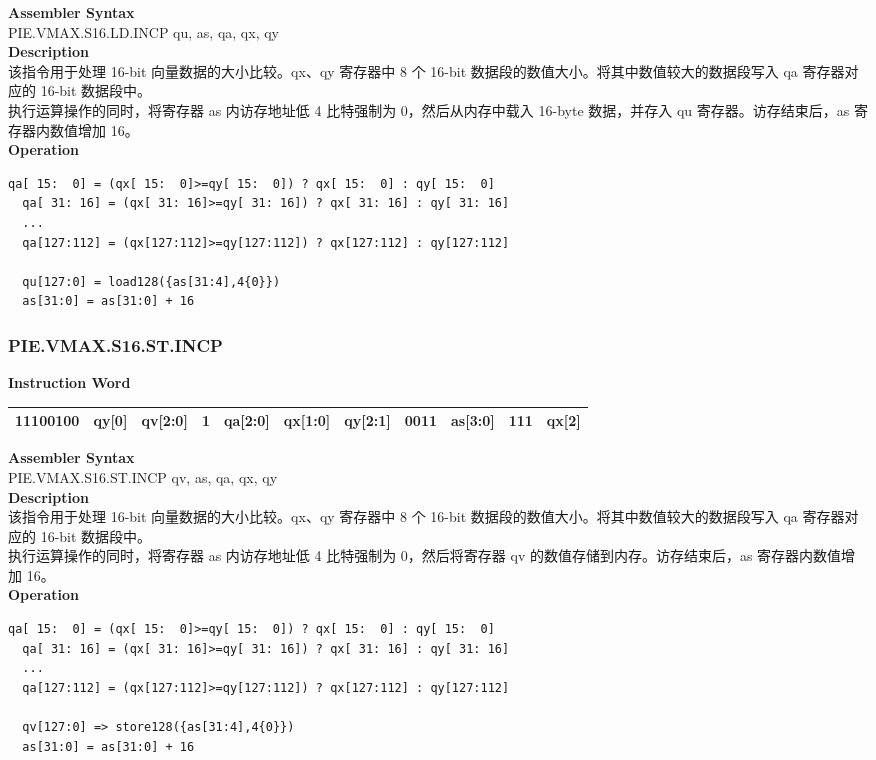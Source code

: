 \textbf{Assembler Syntax} \\
PIE.VMAX.S16.LD.INCP qu, as, qa, qx, qy \\
\textbf{Description} \\
该指令用于处理 16-bit 向量数据的大小比较。qx、qy 寄存器中 8 个 16-bit 数据段的数值大小。将其中数值较大的数据段写入 qa 寄存器对应的 16-bit 数据段中。\\
执行运算操作的同时，将寄存器 as 内访存地址低 4 比特强制为 0，然后从内存中载入 16-byte 数据，并存入 qu 寄存器。访存结束后，as 寄存器内数值增加 16。\\
\textbf{Operation}
\begin{lstlisting}[escapeinside=`?]
  qa[ 15:  0] = (qx[ 15:  0]>=qy[ 15:  0]) ? qx[ 15:  0] : qy[ 15:  0]
  qa[ 31: 16] = (qx[ 31: 16]>=qy[ 31: 16]) ? qx[ 31: 16] : qy[ 31: 16]
  ...
  qa[127:112] = (qx[127:112]>=qy[127:112]) ? qx[127:112] : qy[127:112]

  qu[127:0] = load128({as[31:4],4{0}})
  as[31:0] = as[31:0] + 16
\end{lstlisting}

\newpage
\subsubsection{PIE.VMAX.S16.ST.INCP}\label{instruction:PIEVMAXS16STINCP}
\setlength\tabcolsep{6pt}
\textbf{Instruction Word} \\
\begin{tabular}{|c|c|c|c|c|c|c|c|c|c|c|}
	\hline
	11100100 & qy[0] & qv[2:0] & 1 & qa[2:0] & qx[1:0] & qy[2:1] & 0011 & as[3:0] & 111 & qx[2] \\
	\hline
\end{tabular}

\textbf{Assembler Syntax} \\
PIE.VMAX.S16.ST.INCP qv, as, qa, qx, qy \\
\textbf{Description} \\
该指令用于处理 16-bit 向量数据的大小比较。qx、qy 寄存器中 8 个 16-bit 数据段的数值大小。将其中数值较大的数据段写入 qa 寄存器对应的 16-bit 数据段中。\\
执行运算操作的同时，将寄存器 as 内访存地址低 4 比特强制为 0，然后将寄存器 qv 的数值存储到内存。访存结束后，as 寄存器内数值增加 16。\\
\textbf{Operation}
\begin{lstlisting}[escapeinside=`?]
  qa[ 15:  0] = (qx[ 15:  0]>=qy[ 15:  0]) ? qx[ 15:  0] : qy[ 15:  0]
  qa[ 31: 16] = (qx[ 31: 16]>=qy[ 31: 16]) ? qx[ 31: 16] : qy[ 31: 16]
  ...
  qa[127:112] = (qx[127:112]>=qy[127:112]) ? qx[127:112] : qy[127:112]

  qv[127:0] => store128({as[31:4],4{0}})
  as[31:0] = as[31:0] + 16
\end{lstlisting}

